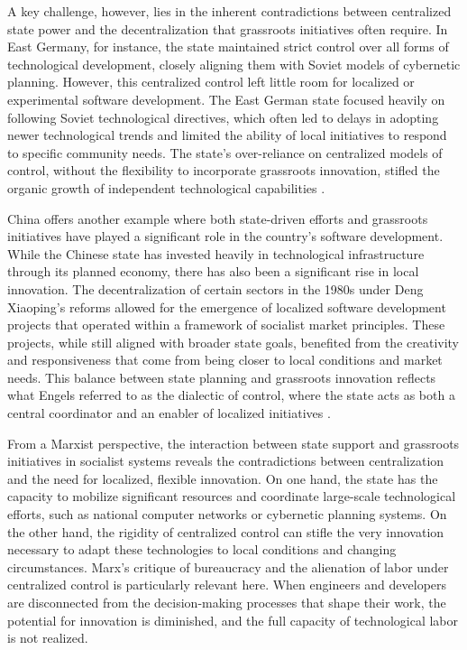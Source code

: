\begin{refsection}
A key challenge, however, lies in the inherent contradictions between centralized state power and the decentralization that grassroots initiatives often require. In East Germany, for instance, the state maintained strict control over all forms of technological development, closely aligning them with Soviet models of cybernetic planning. However, this centralized control left little room for localized or experimental software development. The East German state focused heavily on following Soviet technological directives, which often led to delays in adopting newer technological trends and limited the ability of local initiatives to respond to specific community needs. The state’s over-reliance on centralized models of control, without the flexibility to incorporate grassroots innovation, stifled the organic growth of independent technological capabilities \cite[pp.~56-59]{berghoff2013}.

China offers another example where both state-driven efforts and grassroots initiatives have played a significant role in the country’s software development. While the Chinese state has invested heavily in technological infrastructure through its planned economy, there has also been a significant rise in local innovation. The decentralization of certain sectors in the 1980s under Deng Xiaoping’s reforms allowed for the emergence of localized software development projects that operated within a framework of socialist market principles. These projects, while still aligned with broader state goals, benefited from the creativity and responsiveness that come from being closer to local conditions and market needs. This balance between state planning and grassroots innovation reflects what Engels referred to as the dialectic of control, where the state acts as both a central coordinator and an enabler of localized initiatives \cite[pp.~78-80]{huang2008}.

From a Marxist perspective, the interaction between state support and grassroots initiatives in socialist systems reveals the contradictions between centralization and the need for localized, flexible innovation. On one hand, the state has the capacity to mobilize significant resources and coordinate large-scale technological efforts, such as national computer networks or cybernetic planning systems. On the other hand, the rigidity of centralized control can stifle the very innovation necessary to adapt these technologies to local conditions and changing circumstances. Marx’s critique of bureaucracy and the alienation of labor under centralized control is particularly relevant here. When engineers and developers are disconnected from the decision-making processes that shape their work, the potential for innovation is diminished, and the full capacity of technological labor is not realized.


\end{refsection}
